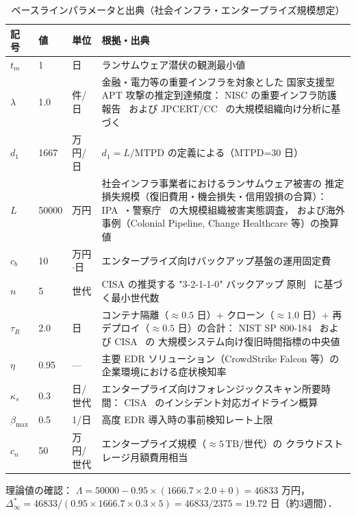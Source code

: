 \documentclass[12pt,a4paper]{article}
\theoremstyle{plain}
\theoremstyle{definition}
\theoremstyle{remark}
\newcommand{\Dinf}{\Delta^{*}_{\infty}}
\newcommand{\La}{\Lambda}
\begin{document}
\begin{table}[H]
\centering\small
\caption{ベースラインパラメータと出典（社会インフラ・エンタープライズ規模想定）}
\label{tab:params}
\begin{tabular}{@{}lll p{72mm}@{}}
\toprule
記号 & 値 & 単位 & 根拠・出典 \\
\midrule
$t_m$ & 1 & 日 & ランサムウェア潜伏の観測最小値~\cite{mandiant2023,crowdstrike2023} \\
$\lambda$ & 1.0 & 件/日 & 金融・電力等の重要インフラを対象とした
  国家支援型 APT 攻撃の推定到達頻度：
  NISC の重要インフラ防護報告~\cite{nisc2023} および
  JPCERT/CC~\cite{jpcert2023} の大規模組織向け分析に基づく \\
$d_1$ & 1667 & 万円/日 & $d_1=L/\mathrm{MTPD}$ の定義による（MTPD=30 日） \\
$L$ & 50000 & 万円 & 社会インフラ事業者におけるランサムウェア被害の
  推定損失規模（復旧費用・機会損失・信用毀損の合算）：
  IPA~\cite{ipa2024}・警察庁~\cite{npa2023} の大規模組織被害実態調査，
  および海外事例（Colonial Pipeline, Change Healthcare 等）の換算値~\cite{ibm2023} \\
$c_b$ & 10 & 万円$\cdot$日 & エンタープライズ向けバックアップ基盤の運用固定費 \\
$n$ & 5 & 世代 & CISA の推奨する "3-2-1-1-0" バックアップ
  原則~\cite{cisa2020} に基づく最小世代数 \\
$\tau_R$ & 2.0 & 日 & コンテナ隔離（$\approx0.5$ 日）+ クローン（$\approx1.0$ 日）+
  再デプロイ（$\approx0.5$ 日）の合計：
  NIST SP 800-184~\cite{nist80034} および CISA~\cite{cisa2020} の
  大規模システム向け復旧時間指標の中央値 \\
$\eta$ & 0.95 & --- & 主要 EDR ソリューション（CrowdStrike Falcon 等）の
  企業環境における症状検知率~\cite{crowdstrike2023,sophos2023} \\
$\kappa_s$ & 0.3 & 日/世代 & エンタープライズ向けフォレンジックスキャン所要時間：
  CISA~\cite{cisa2020} のインシデント対応ガイドライン概算 \\
$\beta_{\max}$ & 0.5 & 1/日 & 高度 EDR 導入時の事前検知レート上限~\cite{crowdstrike2023} \\
$c_n$ & 50 & 万円/世代 & エンタープライズ規模（$\approx5\,\mathrm{TB}$/世代）の
  クラウドストレージ月額費用相当 \\
\bottomrule
\end{tabular}
\end{table}

理論値の確認：
$\La=50000-0.95\times(1666.7\times2.0+0)=46833$ 万円，
$\Dinf=46833/(0.95\times1666.7\times0.3\times5)=46833/2375=19.72$ 日（約3週間）．
\end{document}
